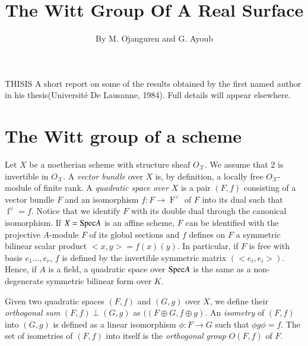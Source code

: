 \title{The Witt Group Of A Real Surface}

\author{By M. Ojanguren and G. Ayoub}

\date{}
\maketitle

\setcounter{page}{337}
\setcounter{pageoriginal}{444}
THIS\pageoriginale IS A short report on some of the results obtained
by the first named author in his thesis(Universit\'{e} De Lausanne, 1984). Full details will appear elsewhere.

\section{The Witt group of a scheme}\label{s1}

Let $X$ be a noetherian scheme with structure sheaf $O_{\mathcal{X}}$. We assume that $2$ is invertible in $O_{\mathcal{X}}$. A \textit{vector bundle} over $X$ is, by definition, a locally free $O_{\mathcal{X}}$-module of finite rank. A \textit{quadratic space over} $X$ is a pair $(F,f)$ consisting of a vector bundle $F$ and an isomorphism $f:F\to \displaystyle\mathop{F}^{\vee}$ of $F$ into its dual such that $\displaystyle\mathop{f}^{\vee}=f$. Notice that we identify $F$ with its double dual through the canonical isomorphism. If $X= \mathrm{Spec} A$ is an affine scheme, $F$ can be identified with the projective $A$-module $F$ of its global sections  and $f$ defines on $F$ a symmetric bilinear scalar product $<x,y>=f(x)(y)$. In particular, if $F$ is free with basis  $e_1\ldots,e_r$, $f$ is defined by the invertible symmetric matrix $(<e_i,e_i>)$. Hence, if $A$ is a field, a quadratic space over $\mathrm{Spec} A$ is the same as a non-degenerate symmetric bilinear form over $K$. 

Given two quadratic spaces $(F, f)$ and $(G,g)$ over $X$, we define their \textit{orthogonal sum} $(F,f)\perp (G,g)$ as $((F\oplus G, f\oplus g)$. An \textit{isometry} of $(F,f)$ into $(G,g)$ is defined as a linear isomorphism $\phi:F\to G$ such that $\phi g\phi=f$. The set of isometries of $(F,f)$ into itself is the \textit{orthogonal group}  $O(F,f)$ of $F$. 

